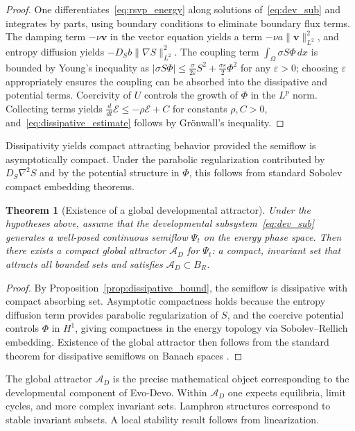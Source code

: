\documentclass[12pt]{article}
\newtheorem{theorem}{Theorem}[section]
\begin{document}
\begin{proof}
One differentiates~\eqref{eq:rsvp_energy} along solutions of~\eqref{eq:dev_sub} and integrates by parts, using boundary conditions to eliminate boundary flux terms. The damping term $-\nu \mathbf{v}$ in the vector equation yields a term $-\nu a\|\mathbf{v}\|_{L^2}^2$, and entropy diffusion yields $-D_S b\|\nabla S\|_{L^2}^2$. The coupling term $\int_\Omega \sigma S\Phi\,dx$ is bounded by Young's inequality as $|\sigma S\Phi| \leq \frac{\sigma}{2\varepsilon}S^2 + \frac{\sigma\varepsilon}{2}\Phi^2$ for any $\varepsilon > 0$; choosing $\varepsilon$ appropriately ensures the coupling can be absorbed into the dissipative and potential terms. Coercivity of $U$ controls the growth of $\Phi$ in the $L^p$ norm. Collecting terms yields $\frac{d}{dt}\mathcal{E} \leq -\rho \mathcal{E} + C$ for constants $\rho, C > 0$, and~\eqref{eq:dissipative_estimate} follows by Gr\"{o}nwall's inequality.
\end{proof}

Dissipativity yields compact attracting behavior provided the semiflow is asymptotically compact. Under the parabolic regularization contributed by $D_S \nabla^2 S$ and by the potential structure in $\Phi$, this follows from standard Sobolev compact embedding theorems.

\begin{theorem}[Existence of a global developmental attractor]
\label{thm:global_attractor}
Under the hypotheses above, assume that the developmental subsystem~\eqref{eq:dev_sub} generates a well-posed continuous semiflow $\Psi_t$ on the energy phase space. Then there exists a compact global attractor $\mathcal{A}_D$ for $\Psi_t$: a compact, invariant set that attracts all bounded sets and satisfies $\mathcal{A}_D \subset B_R$.
\end{theorem}

\begin{proof}
By Proposition~\ref{prop:dissipative_bound}, the semiflow is dissipative with compact absorbing set. Asymptotic compactness holds because the entropy diffusion term provides parabolic regularization of $S$, and the coercive potential controls $\Phi$ in $H^1$, giving compactness in the energy topology via Sobolev--Rellich embedding. Existence of the global attractor then follows from the standard theorem for dissipative semiflows on Banach spaces \cite{strogatz1994}.
\end{proof}

The global attractor $\mathcal{A}_D$ is the precise mathematical object corresponding to the developmental component of Evo-Devo. Within $\mathcal{A}_D$ one expects equilibria, limit cycles, and more complex invariant sets. Lamphron structures correspond to stable invariant subsets. A local stability result follows from linearization.
\end{document}
